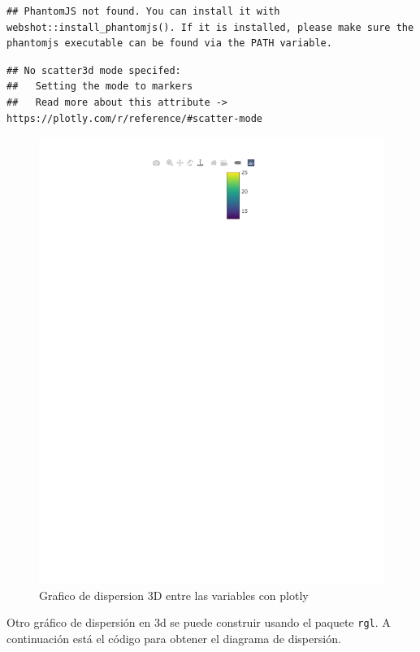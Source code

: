 \documentclass[
]{book}
\begin{document}
\begin{verbatim}
## PhantomJS not found. You can install it with webshot::install_phantomjs(). If it is installed, please make sure the phantomjs executable can be found via the PATH variable.
\end{verbatim}

\begin{verbatim}
## No scatter3d mode specifed:
##   Setting the mode to markers
##   Read more about this attribute -> https://plotly.com/r/reference/#scatter-mode
\end{verbatim}

\begin{figure}
\centering
\includegraphics{_main_files/figure-latex/explorplotly-1.pdf}
\caption{\label{fig:explorplotly}Grafico de dispersion 3D entre las variables con plotly}
\end{figure}

Otro gráfico de dispersión en 3d se puede construir usando el paquete \texttt{rgl}. A continuación está el código para obtener el diagrama de dispersión.
\end{document}
